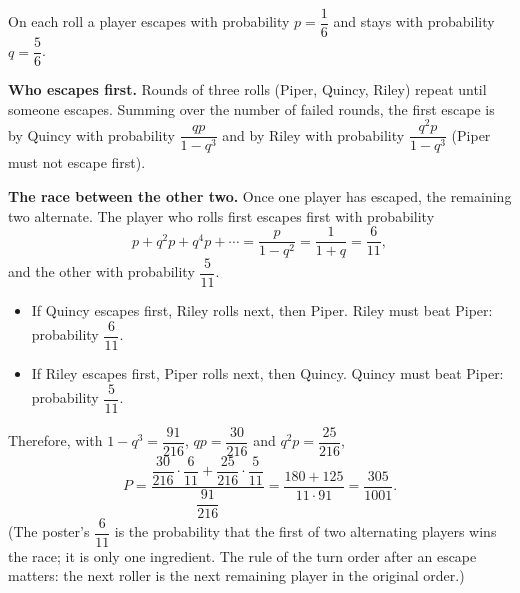 On each roll a player escapes with probability $p=\dfrac{1}{6}$ and stays with probability $q=\dfrac{5}{6}$.

\textbf{Who escapes first.} Rounds of three rolls (Piper, Quincy, Riley) repeat until someone escapes. Summing over the number of failed rounds, the first escape is by Quincy with probability $\dfrac{qp}{1-q^3}$ and by Riley with probability $\dfrac{q^2p}{1-q^3}$ (Piper must not escape first).

\textbf{The race between the other two.} Once one player has escaped, the remaining two alternate. The player who rolls first escapes first with probability
\[
p+q^2p+q^4p+\cdots=\dfrac{p}{1-q^2}=\dfrac{1}{1+q}=\dfrac{6}{11},
\]
and the other with probability $\dfrac{5}{11}$.
\begin{itemize}
\item If Quincy escapes first, Riley rolls next, then Piper. Riley must beat Piper: probability $\dfrac{6}{11}$.
\item If Riley escapes first, Piper rolls next, then Quincy. Quincy must beat Piper: probability $\dfrac{5}{11}$.
\end{itemize}
Therefore, with $1-q^3=\dfrac{91}{216}$, $qp=\dfrac{30}{216}$ and $q^2p=\dfrac{25}{216}$,
\[
P=\dfrac{\dfrac{30}{216}\cdot\dfrac{6}{11}+\dfrac{25}{216}\cdot\dfrac{5}{11}}{\dfrac{91}{216}}=\dfrac{180+125}{11\cdot91}=\boxed{\dfrac{305}{1001}} .
\]
(The poster's $\dfrac{6}{11}$ is the probability that the first of two alternating players wins the race; it is only one ingredient. The rule of the turn order after an escape matters: the next roller is the next remaining player in the original order.)
